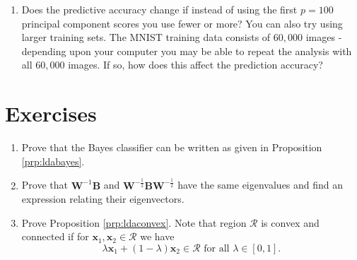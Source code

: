 \documentclass[
]{book}
\newenvironment{Shaded}{\begin{snugshade}}{\end{snugshade}}
\newcommand{\FunctionTok}[1]{\textcolor[rgb]{0.13,0.29,0.53}{\textbf{#1}}}
\newcommand{\NormalTok}[1]{#1}
\newcommand{\OtherTok}[1]{\textcolor[rgb]{0.56,0.35,0.01}{#1}}
\newcommand{\SpecialCharTok}[1]{\textcolor[rgb]{0.81,0.36,0.00}{\textbf{#1}}}
\providecommand{\tightlist}{%
  \setlength{\itemsep}{0pt}\setlength{\parskip}{0pt}}
\theoremstyle{definition}
\theoremstyle{definition}
\theoremstyle{definition}
\theoremstyle{definition}
\theoremstyle{remark}
\begin{document}
\begin{Shaded}
\end{Shaded}

\begin{enumerate}
\def\labelenumi{\alph{enumi}.}
\setcounter{enumi}{21}
\tightlist
\item
  Does the predictive accuracy change if instead of using the first \(p=100\) principal component scores you use fewer or more? You can also try using larger training sets. The MNIST training data consists of \(60,000\) images - depending upon your computer you may be able to repeat the analysis with all \(60,000\) images. If so, how does this affect the prediction accuracy?
\end{enumerate}

\section{Exercises}\label{exercises-5}

\begin{enumerate}
\def\labelenumi{\arabic{enumi}.}
\item
  Prove that the Bayes classifier can be written as given in Proposition \ref{prp:ldabayes}.
\item
  Prove that \(\mathbf W^{-1}\mathbf B\) and \(\mathbf W^{-\frac{1}{2}}\mathbf B\mathbf W^{-\frac{1}{2}}\) have the same eigenvalues and find an expression relating their eigenvectors.
\item
  Prove Proposition \ref{prp:ldaconvex}. Note that region \(\mathcal{R}\) is convex and connected if for \(\mathbf x_1, \mathbf x_2 \in \mathcal{R}\) we have
  \[\lambda \mathbf x_1+(1-\lambda) \mathbf x_2 \in \mathcal{R} \mbox{ for all } \lambda \in [0,1].\]
\end{enumerate}
\end{document}
